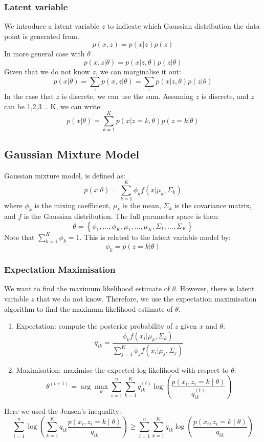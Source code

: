 \documentclass[12pt,a4paper]{article}
\begin{document}
\subsubsection{Latent variable}
We introduce a latent variable $z$ to indicate which Gaussian distribution the data point is generated from.
$$
p(x, z)=p(x | z) p(z)
$$
In more general case with $\theta$
$$
p(x, z | \theta)=p(x | z, \theta) p(z | \theta)
$$
Given that we do not know $z$, we can marginalise it out:
$$
p(x | \theta)=\sum_{z} p(x, z | \theta)=\sum_{z} p(x | z, \theta) p(z | \theta)
$$
In the case that $z$ is discrete, we can use the sum. Assuming $z$ is discrete, and $z$ can be 1,2,3 .. K, we can write:
$$
p(x | \theta)=\sum_{k=1}^K p(x | z=k, \theta) p(z=k | \theta)
$$
\subsection{Gaussian Mixture Model}
Gaussian mixture model, is defined as:
$$
p(x | \theta)=\sum_{k=1}^K \phi_k f\left(x | \mu_k, \Sigma_k\right)
$$
where $\phi_k$ is the mixing coefficient, $\mu_k$ is the mean, $\Sigma_k$ is the covariance matrix, and $f$ is the Gaussian distribution.
The full parameter space is then:
$$
\theta=\left\{\phi_1, \ldots, \phi_K, \mu_1, \ldots, \mu_K, \Sigma_1, \ldots, \Sigma_K\right\}
$$
Note that $\sum_{k=1}^K \phi_k = 1$.
This is related to the latent variable model by:
$$
\phi_k=p(z=k | \theta)
$$
\subsubsection{Expectation Maximisation}
We want to find the maximum likelihood estimate of $\theta$. However, there is latent variable $z$ that we do not know.
Therefore, we use the expectation maximisation algorithm to find the maximum likelihood estimate of $\theta$.
\begin{enumerate}
    \item Expectation: compute the posterior probability of $z$ given $x$ and $\theta$:
    $$
    q_{ik}=\frac{\phi_k f\left(x_i | \mu_k, \Sigma_k\right)}{\sum_{j=1}^K \phi_j f\left(x_i | \mu_j, \Sigma_j\right)}
    $$
    \item Maximisation: maximise the expected log likelihood with respect to $\theta$:
    $$
    \theta^{(t+1)}=\arg \max _\theta \sum_{i=1}^n \sum_{k=1}^K q_{i k}^{(t)} \log \left(\frac{p\left(x_i, z_i=k \mid \theta\right)}{q_{i k}^{(t)}}\right)
    $$
\end{enumerate}
Here we used the Jensen's inequality:
$$
\sum_{i=1}^n \log \left(\sum_{k=1}^K q_{i k} \frac{p\left(x_i, z_i=k \mid \theta\right)}{q_{i k}}\right) \geq \sum_{i=1}^n \sum_{k=1}^K q_{i k} \log \left(\frac{p\left(x_i, z_i=k \mid \theta\right)}{q_{i k}}\right)
$$
\end{document}
